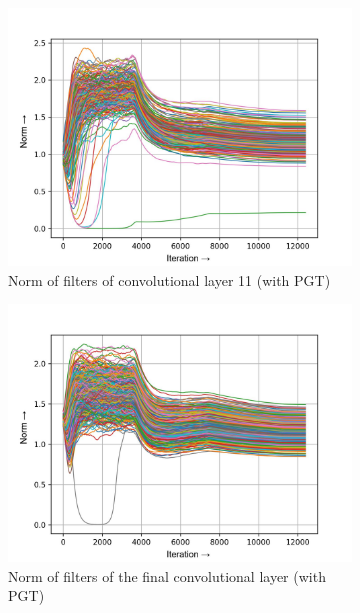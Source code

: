 \documentclass[times,sort&compress]{elsarticle}
\begin{document}
\begin{figure}[t]
\begin{subfigure}[t]{0.32\textwidth}
\includegraphics[width=\linewidth]{pgt-w-layer-4-2}
\caption{Norm of filters of convolutional layer 11 (with PGT)}
\end{subfigure}
\begin{subfigure}[t]{0.32\textwidth}
\includegraphics[width=\linewidth]{pgt-w-layer-7-2}
\caption{Norm of filters of the final convolutional layer (with PGT)}
\end{subfigure}
\begin{subfigure}[t]{0.32\textwidth}

\end{subfigure}
\end{figure}
\end{document}
